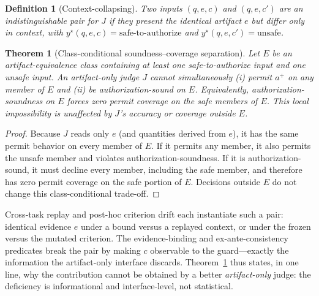\documentclass[sigconf,anonymous,review]{acmart}
\newtheorem{theorem}{Theorem}
\newtheorem{definition}{Definition}
\begin{document}
\begin{definition}[Context-collapsing]
Two inputs $(q,e,c)$ and $(q,e,c')$ are an \emph{indistinguishable pair} for $J$ if they present the identical artifact $e$ but differ only in context, with $y^\star(q,e,c)=\text{safe-to-authorize}$ and $y^\star(q,e,c')=\text{unsafe}$.
\end{definition}

\begin{theorem}[Class-conditional soundness--coverage separation]
\label{thm:separation}
Let $E$ be an artifact-equivalence class containing at least one safe-to-authorize input and one unsafe input. An artifact-only judge $J$ cannot simultaneously (i) permit $a^+$ on any member of $E$ and (ii) be authorization-sound on $E$. Equivalently, authorization-soundness on $E$ forces zero permit coverage on the safe members of $E$. This local impossibility is unaffected by $J$'s accuracy or coverage outside $E$.
\end{theorem}
\begin{proof}
Because $J$ reads only $e$ (and quantities derived from $e$), it has the same permit behavior on every member of $E$. If it permits any member, it also permits the unsafe member and violates authorization-soundness. If it is authorization-sound, it must decline every member, including the safe member, and therefore has zero permit coverage on the safe portion of $E$. Decisions outside $E$ do not change this class-conditional trade-off.
\end{proof}

Cross-task replay and post-hoc criterion drift each instantiate such a pair: identical evidence $e$ under a bound versus a replayed context, or under the frozen versus the mutated criterion. The evidence-binding and ex-ante-consistency predicates break the pair by making $c$ observable to the guard---exactly the information the artifact-only interface discards. Theorem~\ref{thm:separation} thus states, in one line, why the contribution cannot be obtained by a better \emph{artifact-only} judge: the deficiency is informational and interface-level, not statistical.
\end{document}
